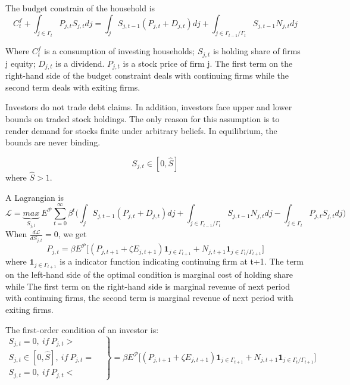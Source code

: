 \documentclass[cn,10pt,math=newtx,citestyle=gb7714-2015,bibstyle=gb7714-2015]{elegantbook}
\begin{document}
{{	The budget constrain of the household is
	\begin{equation*}
		C_t^f+\int_{j \in \varGamma_t} P_{j,t}S_{j,t}dj=\int_jS_{j,t-1}(P_{j,t}+D_{j,t})dj+\int_{j \in \varGamma_{t-1}/\varGamma_t} S_{j,t-1}N_{j,t}dj
	\end{equation*}
	
	Where $C_t^f$ is a consumption of investing households; $S_{j,t}$ is holding share of firms j equity;  $D_{j,t}$ is a dividend. $P_{j,t}$ is a stock price of firm j. The first term on the right-hand side of the budget constraint deals with continuing firms while the second term deals with exiting firms.
	
	Investors do not trade debt claims. In addition, investors face upper and lower bounds on traded stock holdings. The only reason for this assumption is to render demand for stocks finite under arbitrary beliefs. In equilibrium, the bounds are never binding.
	
	\begin{equation}
		S_{j,t} \in [0, \hat{S}]
	\end{equation}
	where $\hat{S}>1$.
	
	A Lagrangian is
	\begin{equation*}
		\mathcal{L}=\underbrace{max}_{S_{j,t}}~\mathit{E}^{\mathcal{P}} \sum_{t=0}^{\infty}\beta^t\bigg(\int_jS_{j,t-1}(P_{j,t}+D_{j,t})dj+\int_{j \in \varGamma_{t-1}/\varGamma_t} S_{j,t-1}N_{j,t}dj-\int_{j \in \varGamma_t} P_{j,t}S_{j,t}dj\bigg)
	\end{equation*}
	When $\frac{d\mathcal{L}}{dS_{j,t}}=0$, we get
	\begin{equation*}
		P_{j,t}=\beta\mathit{E}^{\mathcal{P}}\big[(P_{j,t+1}+\zeta E_{j,t+1}){\mathbf{1}_{j\in \varGamma_{t+1}}+N_{j,t+1}\mathbf{1}_{j\in \varGamma_t/\varGamma_{t+1}}\big]}
		\end{equation*}
		where $\mathbf{1}_{j\in \varGamma_{t+1}}$ is a indicator function indicating continuing firm at t+1. The term on the left-hand side of the optimal condition is marginal cost of holding share while The first term on the right-hand side is marginal revenue of next period with continuing firms, the second term is marginal revenue of next period with exiting firms.
		
		
		The first-order condition of an investor is:
		\begin{equation}
			\left.
			\begin{array}{lr}
				S_{j,t}=0, ~if~ P_{j,t}>&  \\
				S_{j,t}\in [0, \hat{S}],~ if~ P_{j,t}=\\
				S_{j,t}=0, ~if~ P_{j,t}< &  
			\end{array}
			\right\}=\beta\mathit{E}^{\mathcal{P}}\big[(P_{j,t+1}+\zeta E_{j,t+1}){\mathbf{1}_{j\in \varGamma_{t+1}}+N_{j,t+1}\mathbf{1}_{j\in \varGamma_t/\varGamma_{t+1}}\big]}
			\end{equation}
			
}}
\end{document}
